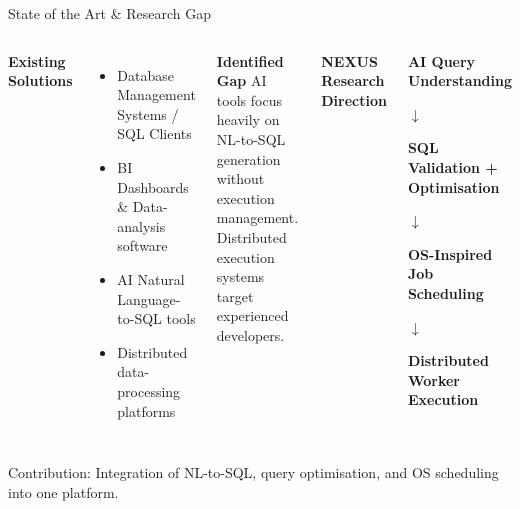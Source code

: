 \documentclass[aspectratio=169,11pt]{beamer}
\newcommand{\smallnote}[1]{%
    \vspace{0.05cm}%
    {\tiny\color{GEUGrey}#1}%
}
\newcommand{\tagbox}[1]{%
    \colorbox{GEULightBlue}{%
        \textcolor{GEUBlue}{\scriptsize\textbf{#1}}%
    }%
}
\begin{document}

\begin{frame}{State of the Art \& Research Gap}

\begin{columns}[T,totalwidth=\textwidth]


\textbf{\color{GEUBlue}\small Existing Solutions}
\begin{itemize}\itemsep1pt
\item[\tiny$\bullet$] \scriptsize Database Management Systems / SQL Clients
\item[\tiny$\bullet$] \scriptsize BI Dashboards \& Data-analysis software
\item[\tiny$\bullet$] \scriptsize AI Natural Language-to-SQL tools
\item[\tiny$\bullet$] \scriptsize Distributed data-processing platforms
\end{itemize}

\vspace{1mm}

\textbf{\color{GEUBlue}\small Identified Gap}
\scriptsize
AI tools focus heavily on NL-to-SQL generation without execution management. Distributed execution systems target experienced developers.


\textbf{\color{GEUBlue}\small NEXUS Research Direction}

\begin{center}
\tagbox{AI Query Understanding}

\vspace{1mm}
$\downarrow$
\vspace{1mm}

\tagbox{SQL Validation + Optimisation}

\vspace{1mm}
$\downarrow$
\vspace{1mm}

\tagbox{OS-Inspired Job Scheduling}

\vspace{1mm}
$\downarrow$
\vspace{1mm}

\tagbox{Distributed Worker Execution}
\end{center}

\end{columns}

\vfill
\smallnote{Contribution: Integration of NL-to-SQL, query optimisation, and OS scheduling into one platform.}

\end{frame}
\end{document}
